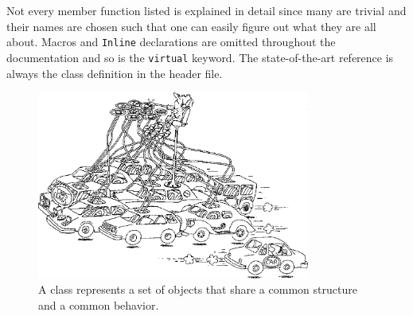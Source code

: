 \documentclass[twoside]{article}
\begin{document}
Not every member function listed is explained in detail since many are
trivial and their names are chosen such that one can easily figure out
what they are all about.  Macros and \texttt{Inline} declarations are
omitted throughout the documentation and so is the \texttt{virtual}
keyword.  The state-of-the-art reference is always the class
definition in the header file.
\begin{figure}[htb]
    \begin{center}
        \includegraphics[width=0.8\textwidth]{cartoon8.eps}
        \caption{A class represents a set of objects that share
            a common structure and a common behavior.}
    \end{center}
\end{figure}
\clearpage
\end{document}
